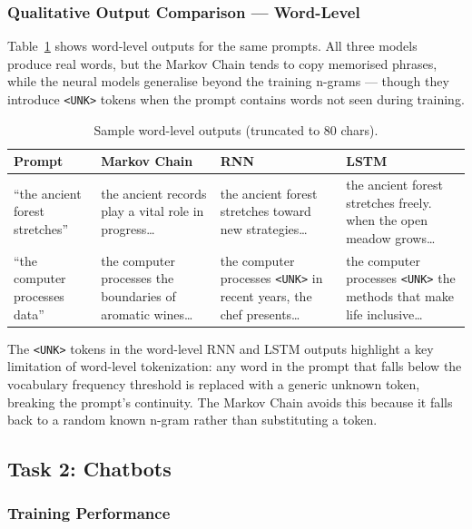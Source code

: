 \subsubsection*{Qualitative Output Comparison — Word-Level}

Table~\ref{tab:task1_word_outputs} shows word-level outputs for the same prompts.
All three models produce real words, but the Markov Chain tends to copy memorised
phrases, while the neural models generalise beyond the training n-grams — though
they introduce \texttt{<UNK>} tokens when the prompt contains words not seen
during training.

\begin{table}[H]
\centering
\caption{Sample word-level outputs (truncated to 80 chars).}
\label{tab:task1_word_outputs}
\renewcommand{\arraystretch}{1.3}
\begin{tabular}{p{3.2cm} p{3.3cm} p{3.3cm} p{3.3cm}}
\toprule
\textbf{Prompt} & \textbf{Markov Chain} & \textbf{RNN} & \textbf{LSTM} \\
\midrule
``the ancient forest stretches'' &
the ancient records play a vital role in progress\ldots &
the ancient forest stretches toward new strategies\ldots &
the ancient forest stretches freely. when the open meadow grows\ldots \\
\midrule
``the computer processes data'' &
the computer processes the boundaries of aromatic wines\ldots &
the computer processes \texttt{<UNK>} in recent years, the chef presents\ldots &
the computer processes \texttt{<UNK>} the methods that make life inclusive\ldots \\
\bottomrule
\end{tabular}
\end{table}

The \texttt{<UNK>} tokens in the word-level RNN and LSTM outputs highlight a key
limitation of word-level tokenization: any word in the prompt that falls below the
vocabulary frequency threshold is replaced with a generic unknown token, breaking
the prompt's continuity. The Markov Chain avoids this because it falls back to a
random known n-gram rather than substituting a token.

\subsection{Task 2: Chatbots}

\subsubsection*{Training Performance}

